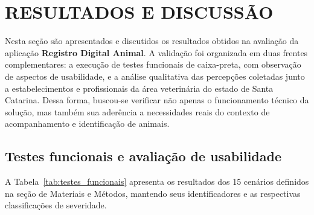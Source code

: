 \documentclass{UNESC}
\begin{document}
\section{RESULTADOS E DISCUSSÃO}

Nesta seção são apresentados e discutidos os resultados obtidos na avaliação da aplicação \textbf{Registro Digital Animal}. A validação foi organizada em duas frentes complementares: a execução de testes funcionais de caixa-preta, com observação de aspectos de usabilidade, e a análise qualitativa das percepções coletadas junto a estabelecimentos e profissionais da área veterinária do estado de Santa Catarina. Dessa forma, buscou-se verificar não apenas o funcionamento técnico da solução, mas também sua aderência a necessidades reais do contexto de acompanhamento e identificação de animais.

\subsection{Testes funcionais e avaliação de usabilidade}

A Tabela~\ref{tab:testes_funcionais} apresenta os resultados dos 15 cenários definidos na seção de Materiais e Métodos, mantendo seus identificadores e as respectivas classificações de severidade.
\end{document}
